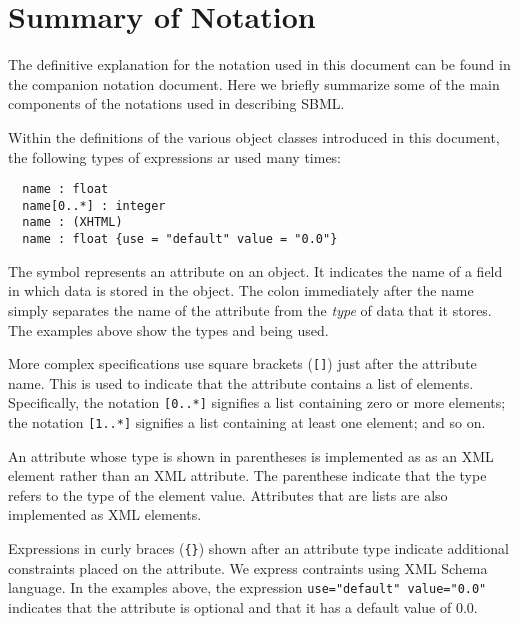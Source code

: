 \documentclass[10pt]{cek-article}
\begin{document}
\section{Summary of Notation}
\label{appendix:notation}

The definitive explanation for the notation used in this document can be
found in the companion notation document.  Here we briefly summarize some
of the main components of the notations used in describing SBML.

Within the definitions of the various object classes introduced in this
document, the following types of expressions ar used many times:

\begin{verbatim}
  name : float
  name[0..*] : integer
  name : (XHTML)
  name : float {use = "default" value = "0.0"}
\end{verbatim}

The symbol  represents an attribute on an object.  It
indicates the name of a field in which data is stored in the object.  The
colon immediately after the name simply separates the name of the attribute
from the \emph{type} of data that it stores.  The examples above show the
types  and  being used.

More complex specifications use square brackets (\texttt{[]}) just after
the attribute name.  This is used to indicate that the attribute contains a
list of elements.  Specifically, the notation \texttt{[0..*]} signifies a
list containing zero or more elements; the notation \texttt{[1..*]}
signifies a list containing at least one element; and so on.

An attribute whose type is shown in parentheses is implemented as as an XML
element rather than an XML attribute.  The parenthese indicate that the
type refers to the type of the element value.  Attributes that are lists
are also implemented as XML elements.

Expressions in curly braces (\texttt{\{\}}) shown after an attribute type
indicate additional constraints placed on the attribute.  We express
contraints using XML Schema language.  In the examples above, the expression
\texttt{use="default" value="0.0"} indicates that the attribute is
optional and that it has a default value of $0.0$.


\clearpage
\end{document}
